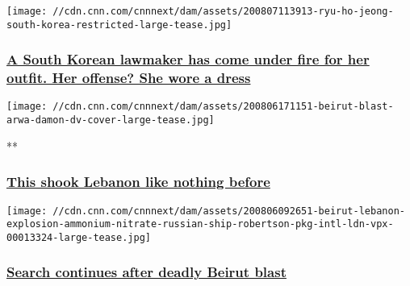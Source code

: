 \texttt{[image: //cdn.cnn.com/cnnnext/dam/assets/200807113913-ryu-ho-jeong-south-korea-restricted-large-tease.jpg]}

\hypertarget{a-south-korean-lawmaker-has-come-under-fire-for-her-outfit-her-offense-she-wore-a-dress}{%
\subsubsection{\texorpdfstring{\href{/2020/08/07/asia/south-korea-politician-dress-intl-hnk/index.html}{A
South Korean lawmaker has come under fire for her outfit. Her offense?
She wore a
dress}}{A South Korean lawmaker has come under fire for her outfit. Her offense? She wore a dress}}\label{a-south-korean-lawmaker-has-come-under-fire-for-her-outfit-her-offense-she-wore-a-dress}}

\href{/videos/world/2020/08/06/beirut-explosion-arwa-damon-lon-orig.cnn}{}

\texttt{[image: //cdn.cnn.com/cnnnext/dam/assets/200806171151-beirut-blast-arwa-damon-dv-cover-large-tease.jpg]}

**

\hypertarget{this-shook-lebanon-like-nothing-before}{%
\subsubsection{\texorpdfstring{\href{/videos/world/2020/08/06/beirut-explosion-arwa-damon-lon-orig.cnn}{This
shook Lebanon like nothing
before}}{This shook Lebanon like nothing before}}\label{this-shook-lebanon-like-nothing-before}}

\href{/middleeast/live-news/beirut-lebanon-explosion-08-06-2020/index.html}{}

\texttt{[image: //cdn.cnn.com/cnnnext/dam/assets/200806092651-beirut-lebanon-explosion-ammonium-nitrate-russian-ship-robertson-pkg-intl-ldn-vpx-00013324-large-tease.jpg]}

\hypertarget{search-continues-after-deadly-beirut-blast-1}{%
\subsubsection{\texorpdfstring{\href{/middleeast/live-news/beirut-lebanon-explosion-08-06-2020/index.html}{Search
continues after deadly Beirut
blast}}{Search continues after deadly Beirut blast}}\label{search-continues-after-deadly-beirut-blast-1}}

\href{/videos/world/2020/08/06/beirut-blast-eyewitness-reaction-lon-orig-na.cnn}{}

